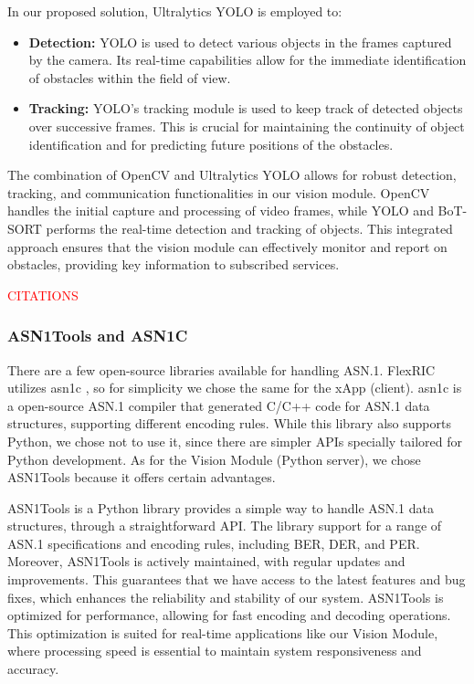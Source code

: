 In our proposed solution, Ultralytics YOLO is employed to:
\begin{itemize}
    \item \textbf{Detection:} YOLO is used to detect various objects in the frames captured by the camera.
    Its real-time capabilities allow for the immediate identification of obstacles within the field of view.
    \item \textbf{Tracking:} YOLO’s tracking module is used to keep track of detected objects over successive frames.
    This is crucial for maintaining the continuity of object identification and for predicting future positions of the obstacles. %
\end{itemize}

The combination of OpenCV and Ultralytics YOLO allows for robust detection, tracking, and communication functionalities in our vision module.
OpenCV handles the initial capture and processing of video frames, while YOLO and BoT-SORT performs the real-time detection and tracking of objects.
This integrated approach ensures that the vision module can effectively monitor and report on obstacles, providing key information to subscribed services.

\textcolor{red}{CITATIONS}
\subsubsection{ASN1Tools and ASN1C}
There are a few open-source libraries available for handling ASN.1.
FlexRIC utilizes asn1c \cite{}, so for simplicity we chose the same for the xApp (client).
asn1c \cite[asn1c]{} is a open-source ASN.1 compiler that generated C/C++ code for ASN.1 data structures, supporting different encoding rules.
While this library also supports Python, we chose not to use it, since there are simpler APIs specially tailored for Python development.
As for the Vision Module (Python server), we chose ASN1Tools because it offers certain advantages.

ASN1Tools is a Python library provides a simple way to handle ASN.1 data structures, through a straightforward API\@.
The library support for a range of ASN.1 specifications and encoding rules, including BER, DER, and PER\@.
Moreover, ASN1Tools is actively maintained, with regular updates and improvements.
This guarantees that we have access to the latest features and bug fixes, which enhances the reliability and stability of our system.
ASN1Tools is optimized for performance, allowing for fast encoding and decoding operations.
This optimization is suited for real-time applications like our Vision Module, where processing speed is essential to maintain system responsiveness and accuracy.

